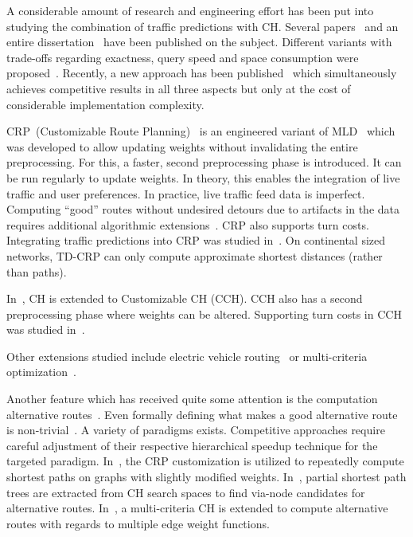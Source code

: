 \documentclass[manuscript,review]{acmart}
\begin{document}
A considerable amount of research and engineering effort has been put into studying the combination of traffic predictions with CH.
Several papers~\cite{bdsv-tdch-09,bgns-tdcha-10,klsv-dtdch-10,bgsv-mtdtt-13} and an entire dissertation~\cite{b-tdrpc-14} have been published on the subject.
Different variants with trade-offs regarding exactness, query speed and space consumption were proposed~\cite{bgsv-mtdtt-13}.
Recently, a new approach has been published~\cite{swz-sfert-20} which simultaneously achieves competitive results in all three aspects but only at the cost of considerable implementation complexity.

CRP~(Customizable Route Planning)~\cite{dgpw-crprn-13} is an engineered variant of MLD~\cite{swz-umlgt-02} which was developed to allow updating weights without invalidating the entire preprocessing.
For this, a faster, second preprocessing phase is introduced.
It can be run regularly to update weights.
In theory, this enables the integration of live traffic and user preferences.
In practice, live traffic feed data is imperfect.
Computing ``good'' routes without undesired detours due to artifacts in the data requires additional algorithmic extensions~\cite{dss-tarrn-18}.
CRP also supports turn costs.
Integrating traffic predictions into CRP was studied in~\cite{bdpw-dtdrp-16}.
On continental sized networks, TD-CRP can only compute approximate shortest distances (rather than paths).

In~\cite{dsw-cch-15}, CH is extended to Customizable CH (CCH).
CCH also has a second preprocessing phase where weights can be altered.
Supporting turn costs in CCH was studied in~\cite{bwzz-cchtc-20}.

Other extensions studied include electric vehicle routing~\cite{DBLP:journals/algorithmica/BaumDPSWZ20,DBLP:conf/aaai/EisnerFS11} or multi-criteria optimization~\cite{fns-opca-14,gks-rpfof-10}.

Another feature which has received quite some attention is the computation alternative routes~\cite{bdgs-argrn-11,adgw-arrn-13}.
Even formally defining what makes a good alternative route is non-trivial~\cite{bdgs-argrn-11}.
A variety of paradigms exists.
Competitive approaches require careful adjustment of their respective hierarchical speedup technique for the targeted paradigm.
In~\cite{krs-eepma-13}, the CRP customization is utilized to repeatedly compute shortest paths on graphs with slightly modified weights.
In~\cite{k-hdara-13}, partial shortest path trees are extracted from CH search spaces to find via-node candidates for alternative routes.
In~\cite{barth2019alternative}, a multi-criteria CH is extended to compute alternative routes with regards to multiple edge weight functions.
\end{document}
